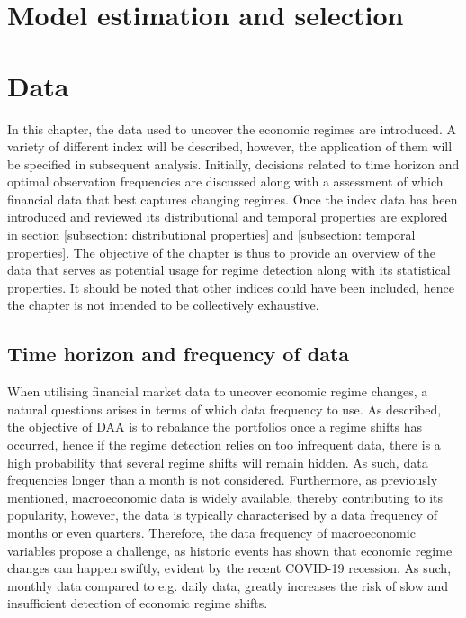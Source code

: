 \section{Model estimation and selection}

\newpage
\section{Data}
\label{section: Data}
In this chapter, the data used to uncover the economic regimes are introduced. A variety of different index will be described, however, the application of them will be specified in subsequent analysis. Initially, decisions related to time horizon and optimal observation frequencies are discussed along with a assessment of which financial data that best captures changing regimes. Once the index data has been introduced and reviewed its distributional and temporal properties are explored in section \ref{subsection: distributional properties} and \ref{subsection: temporal properties}. The objective of the chapter is thus to provide an overview of the data that serves as potential usage for regime detection along with its statistical properties. It should be noted that other indices could have been included, hence the chapter is not intended to be collectively exhaustive. 

\subsection{Time horizon and frequency of data}
\label{subsection: Data frequency}
When utilising financial market data to uncover economic regime changes, a natural questions arises in terms of which data frequency to use. As described, the objective of DAA is to rebalance the portfolios once a regime shifts has occurred, hence if the regime detection relies on too infrequent data, there is a high probability that several regime shifts will remain hidden. As such, data frequencies longer than a month is not considered. Furthermore, as previously mentioned, macroeconomic data is widely available, thereby contributing to its popularity, however, the data is typically characterised by a data frequency of months or even quarters. Therefore, the data frequency of macroeconomic variables propose a challenge, as historic events has shown that economic regime changes can happen swiftly, evident by the recent COVID-19 recession. As such, monthly data compared to e.g. daily data, greatly increases the risk of slow and insufficient detection of economic regime shifts.
 
